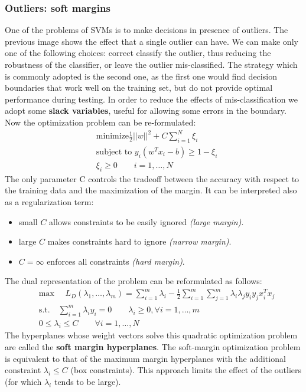 \subsubsection{Outliers: soft margins}
One of the problems of SVMs is to make decisions in presence of outliers.
The previous image shows the effect that a single outlier can have. We can make only one of the following choices: correct classify the outlier, thus reducing the robustness of the classifier, or leave the outlier mis-classified. The strategy which is commonly adopted is the second one, as the first one would find decision boundaries that work well on the training set, but do not provide optimal performance during testing. In order to reduce the effects of mis-classification we adopt some \textbf{slack variables}, useful for allowing some errors in the boundary.
Now the optimization problem can be re-formulated:
\begin{equation*}
\begin{aligned}
&\text{minimize} \frac{1}{2}||w||^2+ C\sum\limits_{i = 1}^N\xi_i\\
&\text{subject to } y_i(w^Tx_i-b)\geq 1 - \xi_i\\
&\xi_i \geq 0 \qquad i = 1,\dots,N
\end{aligned}
\end{equation*}
The only parameter C controls the tradeoff between the accuracy with respect to the training data and the maximization of the margin. It can be interpreted also as a regularization term:
\begin{itemize}
	\item small $C$ allows constraints to be easily ignored \textit{(large margin)}.
	\item large $C$ makes constraints hard to ignore \textit{(narrow margin)}.
	\item $C = \infty$ enforces all constraints \textit{(hard margin)}.
\end{itemize}
The dual representation of the problem can be reformulated as follows:
\begin{equation*}
\begin{aligned}
&\text{max }\quad L_D(\lambda_1,\dots,\lambda_m) = \sum_{i = 1}^{m}\lambda_i - \frac{1}{2}\sum_{i = 1}^{m}\sum_{j = 1}^{m}\lambda_i\lambda_jy_iy_jx_i^Tx_j\\
&\text{s.t.} \quad \sum_{i = 1}^{m}\lambda_iy_i= 0 \qquad \lambda_i \geq 0, \forall i = 1,\dots,m\\
& 0 \leq \lambda_i \leq C \qquad \forall i = 1,\dots, N
\end{aligned}
\end{equation*}
The hyperplanes whose weight vectors solve this quadratic optimization problem are called the \textbf{soft margin hyperplanes}. The soft-margin optimization problem is equivalent to that of the maximum margin hyperplanes with the additional constraint $\lambda_i \leq C$ (box constraints). This approach limits the effect of the outliers (for which $\lambda_i$ tends to be large).

